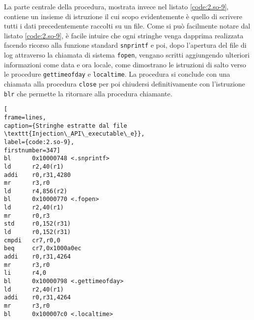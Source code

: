 \documentclass[10pt,a4paper, titlepage]{report}
\begin{document}
La parte centrale della procedura, mostrata invece nel listato \ref{code:2.so-9}, contiene un insieme di istruzione il cui scopo evidentemente è quello di scrivere tutti i dati precedentemente raccolti su un file.
Come si può facilmente notare dal listato  \ref{code:2.so-9}, è facile intuire che ogni stringhe venga dapprima realizzata facendo ricorso alla funzione standard \texttt{snprintf} e poi, dopo l'apertura del file di log attraverso la chiamata di sistema \texttt{fopen}, vengano scritti aggiungendo ulteriori informazioni come data e ora locale, come dimostrano le istruzioni di salto verso le procedure \texttt{gettimeofday} e \texttt{localtime}. 
La procedura si conclude con una chiamata alla procedura \texttt{close} per poi chiudersi definitivamente con l'istruzione \texttt{blr} che permette la ritornare alla procedura chiamante.

\begin{lstlisting}[
frame=lines, 
caption={Stringhe estratte dal file \texttt{Injection\_API\_executable\_e}}, 
label={code:2.so-9},
firstnumber=347]
bl      0x10000748 <.snprintf>
ld      r2,40(r1)
addi    r0,r31,4280
mr      r3,r0
ld      r4,856(r2)
bl      0x10000770 <.fopen>
ld      r2,40(r1)
mr      r0,r3
std     r0,152(r31)
ld      r0,152(r31)
cmpdi   cr7,r0,0
beq     cr7,0x1000a0ec
addi    r0,r31,4264
mr      r3,r0
li      r4,0
bl      0x10000798 <.gettimeofday>
ld      r2,40(r1)
addi    r0,r31,4264
mr      r3,r0
bl      0x100007c0 <.localtime>
\end{lstlisting}

\newpage


\listoffigures
\listoftables
\lstlistoflistings
\end{document}
